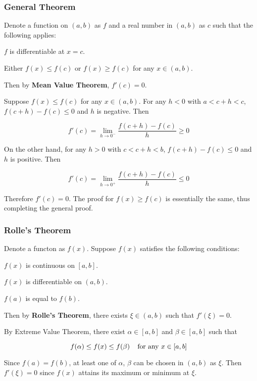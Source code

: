 \documentclass[a4paper,12pt]{article}
\begin{document}
\subsubsection{General Theorem}
\begin{thm}
  Denote a function on $(a,b)$ as $f$ and a real number in $(a,b)$ as $c$ such that the following applies:

  \begin{alist}
    \item $f$ is differentiable at $x=c$.

    \item Either $f(x)\leq f(c)$ or $f(x)\geq f(c)$ for any $x\in (a,b)$.
  \end{alist}

  Then by \textbf{Mean Value Theorem}, $f'(c)=0$.\n

  \prf Suppose $f(x)\leq f(c)$ for any $x\in (a,b)$. For any $h<0$ with $a<c+h<c$, $f(c+h)-f(c)\leq 0$ and $h$ is negative. Then

  $$f'(c)=\lim_{h\to 0^{-}}\frac{f(c+h)-f(c)}{h}\geq 0$$\s

  On the other hand, for any $h>0$ with $c<c+h<b$, $f(c+h)-f(c)\leq 0$ and $h$ is positive. Then

  $$f'(c)=\lim_{h\to 0^{+}}\frac{f(c+h)-f(c)}{h}\leq 0$$\s

  Therefore $f'(c)=0$. The proof for $f(x)\geq f(c)$ is essentially the same, thus completing the general proof.
\end{thm}

\subsubsection{Rolle's Theorem}
\begin{thm}
  Denote a functon as $f(x)$. Suppose $f(x)$ satisfies the following conditions:

  \begin{alist}
    \item $f(x)$ is continuous on $[a,b]$.

    \item $f(x)$ is differentiable on $(a,b)$.

    \item $f(a)$ is equal to $f(b)$.
  \end{alist}

  Then by \textbf{Rolle's Theorem}, there exists $\xi\in(a,b)$ such that $f'(\xi)=0$.\n

  \prf By Extreme Value Theorem, there exist $\alpha\in[a,b]$ and $\beta\in[a,b]$ such that

  $$f(\alpha)\leq f(x)\leq f(\beta)\;\;\;\;\text{for any }x\in [a,b]$$\s

  Since $f(a)=f(b)$, at least one of $\alpha$, $\beta$ can be chosen in $(a,b)$ as $\xi$. Then $f'(\xi)=0$ since $f(x)$ attains its maximum or minimum at $\xi$.
\end{thm}
\end{document}
